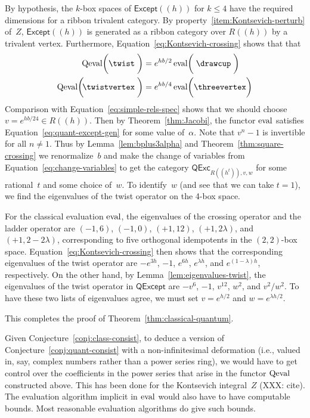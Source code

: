 \documentclass[12pt]{amsart}
\begin{document}
By hypothesis, the $k$-box spaces of $\mathsf{Except}((h))$ for $k \le 4$
have the required dimensions for a ribbon trivalent category. By
property~\eqref{item:Kontsevich-perturb} of~$Z$,
$\mathsf{Except}((h))$
is generated as a ribbon category over $R((h))$ by a
trivalent vertex.
Furthermore, Equation~\eqref{eq:Kontsevich-crossing} shows that
 that
\begin{align*}
  \Qeval\biggl(\twist\;\biggr) &= e^{hb/2}\eval\biggl(\;\drawcup\;\biggr)\\
  \Qeval\biggl(\! \twistvertex\;\biggr) &= e^{hb/4}\eval\biggl(\threevertex\biggr)
\end{align*}
Comparison with Equation~\eqref{eq:simple-rels-spec} shows that we
should choose $v = e^{hb/24} \in R((h))$. Then by Theorem~\ref{thm:Jacobi}, the
functor $\operatorname{eval}$ satisfies Equation~\eqref{eq:quant-except-gen} for
some value of~$\alpha$. Note that $v^n - 1$ is
invertible for all $n \ne 1$. Thus by Lemma~\ref{lem:bplus3alpha} and
Theorem~\ref{thm:square-crossing} we renormalize~$b$ and make the
change of variables
from Equation~\eqref{eq:change-variables} to get the category
$\mathsf{QExc}_{R((h^t)),v,w}$ for some rational~$t$ and some choice
of~$w$. To identify~$w$ (and see that we can take $t=1$), 
we find the eigenvalues
of the twist operator on the 4-box space.

For the classical evaluation $\operatorname{eval}$, the eigenvalues of the crossing
operator and the ladder operator
are $(-1, 6)$, $(-1, 0)$, $(+1, 12)$, $(+1, 2\lambda)$, and
$(+1, 2-2\lambda)$, corresponding to five orthogonal idempotents in the
$(2,2)$-box space. Equation~\eqref{eq:Kontsevich-crossing} then shows
that the corresponding eigenvalues of the twist operator are
$-e^{3h}$, $-1$, $e^{6h}$, $e^{\lambda h}$, and
$e^{(1-\lambda)h}$, respectively.
On the other hand, by Lemma~\ref{lem:eigenvalues-twist}, the
eigenvalues of the twist
operator in $\mathsf{QExcept}$ are $-v^6$, $-1$, $v^{12}$, $w^2$, and
$v^2/w^2$. To have these two lists of eigenvalues agree, we must
set $v = e^{h/2}$ and $w = e^{\lambda h/2}$.

This completes the proof of Theorem~\ref{thm:classical-quantum}.

\begin{remark}
  Given Conjecture~\ref{conj:class-consist}, to deduce a version of
  Conjecture~\ref{conj:quant-consist} with a non-infinitesimal
  deformation (i.e., valued in, say, complex numbers rather than a
  power series ring), we would have to get control over the
  coefficients in the power series that arise in the functor $\operatorname{Qeval}$
  constructed above. This has been done for the Kontsevich
  integral~$Z$ (XXX: cite). The evaluation algorithm implicit in
  $\operatorname{eval}$ would also have to have computable bounds.  Most
  reasonable evaluation algorithms do give such bounds.
\end{remark}
\end{document}
